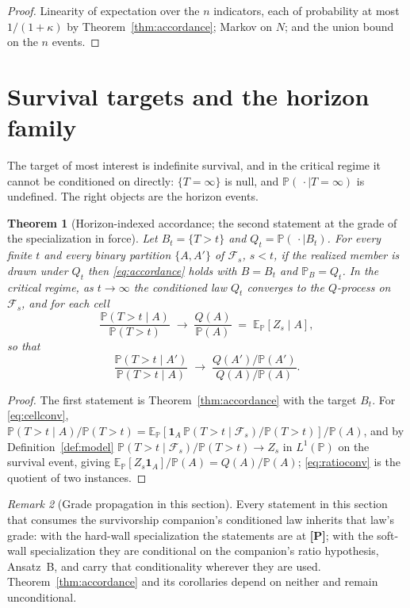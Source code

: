 \documentclass[11pt]{article}
\newcommand{\E}{\mathbb{E}}
\newcommand{\PP}{\mathbb{P}}
\newcommand{\one}{\mathbf{1}}
\newcommand{\Fc}{\mathcal{F}}
\theoremstyle{plain}
\newtheorem{theorem}{Theorem}[section]
\theoremstyle{definition}
\theoremstyle{remark}
\newtheorem{remark}[theorem]{Remark}
\begin{document}
\begin{proof}
Linearity of expectation over the $n$ indicators, each of probability
at most $1/(1+\kappa)$ by Theorem~\ref{thm:accordance}; Markov on $N$;
and the union bound on the $n$ events.
\end{proof}

\section{Survival targets and the horizon family}\label{sec:survival}

The target of most interest is indefinite survival, and in the critical
regime it cannot be conditioned on directly: $\{T=\infty\}$ is null, and
$\PP(\,\cdot\mid T=\infty)$ is undefined. The right objects are the
horizon events.

\begin{theorem}[Horizon-indexed accordance; the second statement at the
grade of the specialization in force]\label{thm:horizon}
Let $B_t=\{T>t\}$ and $Q_t=\PP(\,\cdot\mid B_t)$. For every finite $t$ and
every binary partition $\{A,A'\}$ of $\Fc_s$, $s<t$, if the realized member
is drawn under $Q_t$ then \eqref{eq:accordance} holds with $B=B_t$ and
$\PP_B=Q_t$. In the critical regime, as $t\to\infty$ the conditioned law
$Q_t$ converges to the $Q$-process on $\Fc_s$, and for each cell
\begin{equation}\label{eq:cellconv}
\frac{\PP(T>t\mid A)}{\PP(T>t)}\;\longrightarrow\;\frac{Q(A)}{\PP(A)}
\;=\;\E_\PP[Z_s\mid A],
\end{equation}
so that
\begin{equation}\label{eq:ratioconv}
\frac{\PP(T>t\mid A')}{\PP(T>t\mid A)}\;\longrightarrow\;
\frac{Q(A')/\PP(A')}{Q(A)/\PP(A)}.
\end{equation}
\end{theorem}

\begin{proof}
The first statement is Theorem~\ref{thm:accordance} with the target
$B_t$. For \eqref{eq:cellconv},
$\PP(T>t\mid A)/\PP(T>t)=\E_\PP[\one_A\,\PP(T>t\mid\Fc_s)/\PP(T>t)]/\PP(A)$,
and by Definition~\ref{def:model} $\PP(T>t\mid\Fc_s)/\PP(T>t)\to Z_s$
in $L^1(\PP)$ on the survival event, giving $\E_\PP[Z_s\one_A]/\PP(A)
=Q(A)/\PP(A)$; \eqref{eq:ratioconv} is the quotient of two instances.
\end{proof}

\begin{remark}[Grade propagation in this section]\label{rem:grades}
Every statement in this section that consumes the survivorship
companion's conditioned law inherits that law's grade: with the
hard-wall specialization the statements are at \textbf{[P]}; with the
soft-wall specialization they are conditional on the companion's ratio
hypothesis, Ansatz~B, and carry that conditionality wherever they are
used. Theorem~\ref{thm:accordance} and its corollaries depend on neither
and remain unconditional.
\end{remark}
\end{document}
